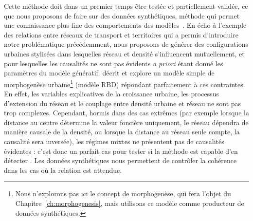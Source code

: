 {Cette méthode doit dans un premier temps être testée et partiellement validée, ce que nous proposons de faire sur des données synthétiques, méthode qui permet une connaissance plus fine des comportements des modèles~\cite{raimbault2016generation}. En écho à l'exemple des relations entre réseaux de transport et territoires qui a permis d'introduire notre problématique précédemment, nous proposons de générer des configurations urbaines stylisées dans lesquelles réseau et densité s'influencent mutuellement, et pour lesquelles les causalités ne sont pas évidents \emph{a priori} étant donné les paramètres du modèle génératif. \cite{raimbault2014hybrid} décrit et explore un modèle simple de morphogenèse urbaine\footnote{Nous n'explorons pas ici le concept de morphogenèse, qui fera l'objet du Chapitre~\ref{ch:morphogenesis}, mais utilisons ce modèle comme producteur de données synthétiques.} (modèle RBD) répondant parfaitement à ces contraintes. En effet, les variables explicatives de la croissance urbaine, les processus d'extension du réseau et le couplage entre densité urbaine et réseau ne sont pas trop complexes. Cependant, hormis dans des cas extrêmes (par exemple lorsque la distance au centre détermine la valeur foncière uniquement, le réseau dépendra de manière causale de la densité, ou lorsque la distance au réseau seule compte, la causalité sera inversée), les régimes mixtes ne présentent pas de causalités évidentes : c'est donc un parfait cas pour tester si la méthode est capable d'en détecter  . Les données synthétiques nous permettent de contrôler la cohérence dans les cas où la relation est attendue.
}



